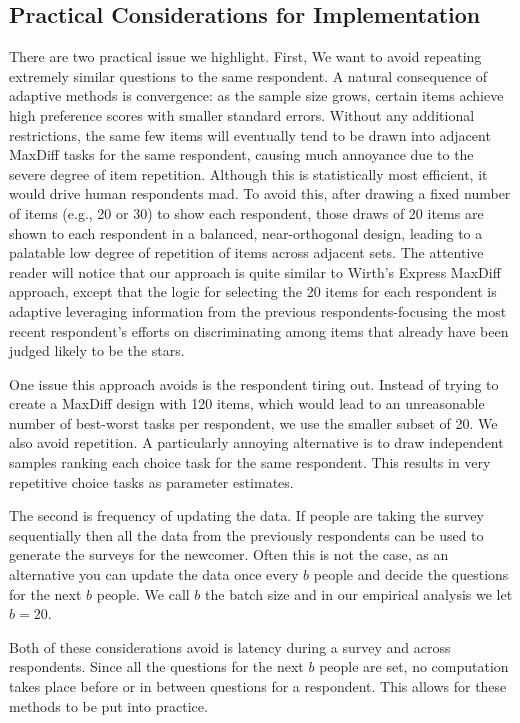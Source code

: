 \documentclass[a4paper,12pt]{article}
\begin{document}
\subsection*{Practical Considerations for Implementation}

There are two practical issue we highlight. First, We want to avoid repeating extremely similar questions to the same respondent. A natural consequence of adaptive methods is convergence: as the sample size grows, certain items achieve high preference scores with smaller standard errors.  Without any additional restrictions, the same few items will eventually tend to be drawn into adjacent MaxDiff tasks for the same respondent, causing much annoyance due to the severe degree of item repetition.  Although this is statistically most efficient, it would drive human respondents mad.  To avoid this, after drawing a fixed number of items (e.g., 20 or 30) to show each respondent,  those draws of 20 items are shown to each respondent in a balanced, near-orthogonal design, leading to a palatable low degree of repetition of items across adjacent sets.  The attentive reader will notice that our approach is quite similar to Wirth's Express MaxDiff approach, except that the logic for selecting the 20 items for each respondent is adaptive leveraging information from the previous respondents-focusing the most recent respondent's efforts on discriminating among items that already have been judged likely to be the stars.

One issue this approach avoids is the respondent tiring out. Instead of trying to create a MaxDiff design with 120 items, which would lead to an unreasonable number of best-worst tasks per respondent, we use the smaller subset of 20.  We also avoid repetition. A particularly annoying alternative is to draw independent samples ranking each choice task for the same respondent. This results in very repetitive choice tasks as parameter estimates.  

The second is frequency of updating the data. If people are taking the survey sequentially then all the data from the previously respondents can be used to generate the surveys for the newcomer. Often this is not the case, as an alternative you can update the data once every $b$ people and decide the questions for the next $b$ people. We call $b$ the batch size and in our empirical analysis we let $b=20$.

Both of these considerations avoid is latency during a survey and across respondents. Since all the questions for the next $b$ people are set, no computation takes place before or in between questions for a respondent. This allows for these methods to be put into practice.
\end{document}
